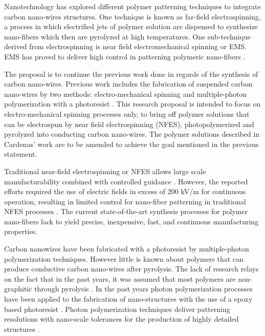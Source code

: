 Nanotechnology has explored different polymer patterning techniques to integrate carbon nano-wires structures. One technique is known as far-field electrospinning, a process in which electrified jets of polymer solution are dispensed to synthesize nano-fibers which then are pyrolyzed at high temperatures. One sub-technique derived from electrospinning is near field electromechanical spinning or EMS. EMS has proved to deliver high control in patterning polymeric nano-fibers \cite{Cardenas2017}.

The proposal is to continue the previous work done in regards of the synthesis of carbon nano-wires. Previous work includes the fabrication of suspended carbon nano-wires by two methods: electro-mechanical spinning and multiple-photon polymerization with a photoresist \cite{Cardenas2017}. This research proposal is intended to focus on electro-mechanical spinning processes only, to bring off polymer solutions that can be electrospun by near field electrospinning (NFES), photopolymerized and pyrolyzed into conducting carbon nano-wires. The polymer solutions described in Cardenas' work \cite{Cardenas2017} are to be amended to achieve the goal mentioned in the previous statement.

Traditional near-field electrospinning or NFES allows large scale manufacturability combined with controlled guidance \cite{Madou2011}. However, the reported efforts required the use of electric fields in excess of 200 kV/m for continuous operation, resulting in limited control for nano-fiber patterning in traditional NFES processes \cite{Madou2011}. The current state-of-the-art synthesis processes for polymer nano-fibers lack to yield precise, inexpensive, fast, and continuous manufacturing properties.

Carbon nanowires have been fabricated with a photoresist by multiple-photon polymerization techniques. However little is known about polymers that can produce conductive carbon nano-wires after pyrolysis. The lack of research relays on the fact that in the past years, it was assumed that most polymers are non-graphitic through pyrolysis \cite{Franklin1951}. In the past years photon polymerization processes have been applied to the fabrication of nano-structures with the use of a epoxy based photoresist \cite{Boer2014}. Photon polymerization techniques deliver patterning resolutions with nano-scale tolerances for the production of highly detailed structures \cite{Hribar2014}.

